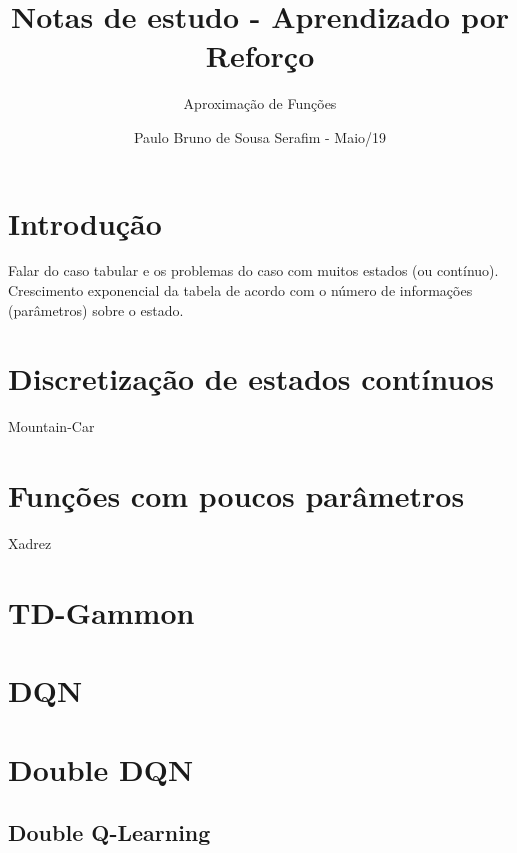 \documentclass{article}
\title{Notas de estudo - Aprendizado por Reforço}
\author{Aproximação de Funções}
\date{Paulo Bruno de Sousa Serafim - Maio/19}
\begin{document}
\maketitle

    \section{Introdução}
    
        Falar do caso tabular e os problemas do caso com muitos estados (ou contínuo). Crescimento exponencial da tabela de acordo com o número de informações (parâmetros) sobre o estado.
    
    \section{Discretização de estados contínuos}
        
        Mountain-Car
    
    \section{Funções com poucos parâmetros}
    
        Xadrez
    
    \section{TD-Gammon}
    
    \section{DQN}
    
    \section{Double DQN}
    
        \subsection{Double Q-Learning}
    
\end{document}
